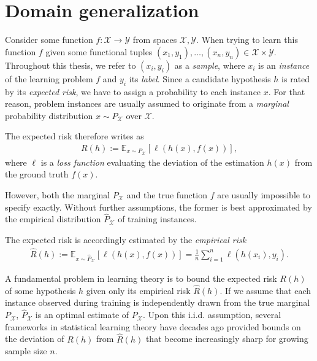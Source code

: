 \section{Domain generalization}
\label{sec:domain-generalization}
Consider some function $f:\mathcal{X}\to\mathcal{Y}$ from spaces $\mathcal{X},\mathcal{Y}$.
When trying to learn this function $f$ given some functional tuples $(x_1,y_1),\dots,(x_n,y_n)\in\mathcal{X}\times\mathcal{Y}$. 
Throughout this thesis, we refer to $(x_i,y_i)$ as a \textit{sample}, where $x_i$ is an \textit{instance} of the learning problem $f$ and $y_i$ its \textit{label}.
Since a candidate hypothesis $h$ is rated by its \textit{expected risk}, we have to assign a probability to each instance $x$.
For that reason, problem instances are usually assumed to originate from a \textit{marginal} probability distribution $x\sim P_\mathcal{X}$ over $\mathcal{X}$.

The expected risk therefore writes as
\begin{align}
	R(h):=\mathbb{E}_{x\sim P_{\mathcal{X}}}\left[\ell(h(x),f(x))\right],	
\end{align}
where $\ell$ is a \textit{loss function} evaluating the deviation of the estimation $h(x)$ from the ground truth $f(x)$.

However, both the marginal $P_{\mathcal{X}}$ and the true function $f$ are usually impossible to specify exactly. 
Without further assumptions, the former is best approximated by the empirical distribution $\hat{P}_{\mathcal{X}}$ of training instances. 

The expected risk is accordingly estimated by the \textit{empirical risk} 
\begin{align}
	\hat{R}(h):=\mathbb{E}_{x\sim \hat{P}_{\mathcal{X}}}\left[\ell(h(x),f(x))\right]=\frac{1}{n}\sum_{i=1}^{n} \ell(h(x_i),y_i).
\end{align}

A fundamental problem in learning theory is to bound the expected risk $R(h)$ of some hypothesis $h$ given only its empirical risk $\hat{R}(h)$.
If we assume that each instance observed during training is independently drawn from the true marginal $P_{\mathcal{X}}$, $\hat{P}_{\mathcal{X}}$ is an optimal estimate of $P_{\mathcal{X}}$.
Upon this i.i.d. assumption, several frameworks in statistical learning theory have decades ago provided bounds on the deviation of $R(h)$ from $\hat{R}(h)$ that become increasingly sharp for growing sample size $n$.

